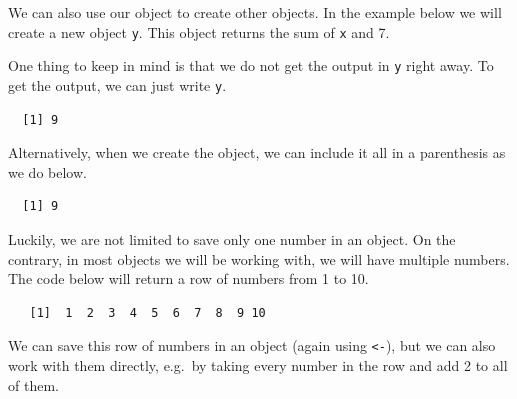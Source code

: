 \documentclass[12pt,oneside]{reedthesis}
\theoremstyle{definition}
\theoremstyle{definition}
\theoremstyle{definition}
\theoremstyle{remark}
\begin{document}
  We can also use our object to create other objects. In the example below
  we will create a new object \texttt{y}. This object returns the sum of
  \texttt{x} and 7.
  \begin{Shaded}
  \begin{Highlighting}[]
  \StringTok{ }\OperatorTok{+}\StringTok{ }
  \end{Highlighting}
  \end{Shaded}
  One thing to keep in mind is that we do not get the output in \texttt{y}
  right away. To get the output, we can just write \texttt{y}.
  \begin{Shaded}
  \begin{Highlighting}[]
  \end{Highlighting}
  \end{Shaded}
  \begin{verbatim}
  [1] 9
  \end{verbatim}
  Alternatively, when we create the object, we can include it all in a
  parenthesis as we do below.
  \begin{Shaded}
  \begin{Highlighting}[]
  \StringTok{ }\OperatorTok{+}\StringTok{ }\NormalTok{)}
  \end{Highlighting}
  \end{Shaded}
  \begin{verbatim}
  [1] 9
  \end{verbatim}
  Luckily, we are not limited to save only one number in an object. On the
  contrary, in most objects we will be working with, we will have multiple
  numbers. The code below will return a row of numbers from 1 to 10.
  \begin{Shaded}
  \begin{Highlighting}[]
  \OperatorTok{:}
  \end{Highlighting}
  \end{Shaded}
  \begin{verbatim}
   [1]  1  2  3  4  5  6  7  8  9 10
  \end{verbatim}
  We can save this row of numbers in an object (again using
  \texttt{\textless{}-}), but we can also work with them directly, e.g.~by
  taking every number in the row and add 2 to all of them.
  \begin{Shaded}
  \begin{Highlighting}[]
  \OperatorTok{:} \OperatorTok{+}\StringTok{ }
  \end{Highlighting}
  \end{Shaded}
\end{document}
